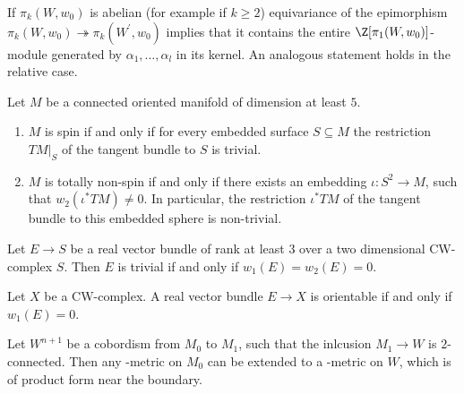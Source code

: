 \begin{remark}
    \label{appendix:rem:zpi_module_in_kernel}
    If $\pi_k(W,w_0)$ is abelian (for example if $k \geq 2$) equivariance of the epimorphism $\pi_k(W,w_0) \twoheadrightarrow \pi_k(W^\prime,w_0)$ implies that it contains the entire $\Z[\pi_1(W,w_0)]$-module generated by $\alpha_1,\ldots,\alpha_l$ in its kernel. An analogous statement holds in the relative case. 
\end{remark}

\begin{proposition}
    \label{bundles:prop:spin_characterisation}
    Let $M$ be a connected oriented manifold of dimension at least $5$.
    \begin{enumerate}[label=(\roman*)]
        \item \label{bundles:eq:characterization_spin} $M$ is spin if and only if for every embedded surface $S \subseteq M$ the restriction $TM|_S$ of the tangent bundle to $S$ is trivial.
        \item \label{bundles:eq:characterization_totally_non_spin} $M$ is totally non-spin if and only if there exists an embedding $ \iota \colon S^2 \to M$, such that $w_2(\iota^\ast TM) \neq 0$. In particular, the restriction $\iota^\ast TM$ of the tangent bundle to this embedded sphere is non-trivial.
    \end{enumerate}
\end{proposition}

\begin{lemma}
    \label{bundles:lem:criterion_for_triviality}
    Let $E \to S$ be a real vector bundle of rank at least $3$ over a two dimensional CW-complex $S$. Then $E$ is trivial if and only if $w_1(E) = w_2(E) = 0$.
\end{lemma}

\begin{proposition}
    \label{bundles:prop:orientable_iff_w1_vanishes}
    Let $X$ be a CW-complex. A real vector bundle $E \to X$ is orientable if and only if $w_1(E) = 0$.
\end{proposition}

\begin{theorem}
    \label{psc:thm:extending_psc_to_cobordism}
    Let $W^{n+1}$ be a cobordism from $M_0$ to $M_1$, such that the inlcusion $M_1 \to W$ is $2$-connected. Then any \psc-metric on $M_0$ can be extended to a \psc-metric on $W$, which is of product form near the boundary.
\end{theorem}